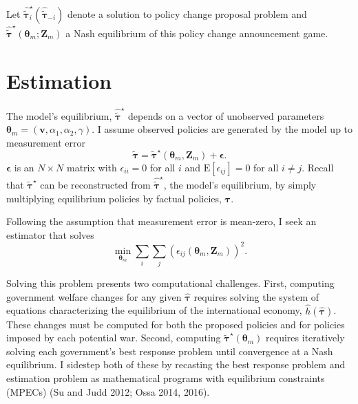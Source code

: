 \documentclass{puthesis}
\newcommand{\E}{\mathrm{E}}
\begin{document}
Let \(\hat{\tilde{\bm{\tau}}}_i^\star(\hat{\tilde{\bm{\tau}}}_{-i})\)
denote a solution to policy change proposal problem and
\(\hat{\tilde{\bm{\tau}}}^\star(\bm{\theta}_m; \bm{Z}_m)\) a Nash
equilibrium of this policy change announcement game.

\section{Estimation}

The model's equilibrium, \(\hat{\tilde{\bm{\tau}}}^\star\) depends on a
vector of unobserved parameters
\(\bm{\theta}_m = \left( \bm{v}, \alpha_1, \alpha_2, \gamma \right)\). I
assume observed policies are generated by the model up to measurement
error \[
\tilde{\bm{\tau}} = \tilde{\bm{\tau}}^\star(\bm{\theta}_m, \bm{Z}_m) + \bm{\epsilon} . 
\] \(\bm{\epsilon}\) is an \(N \times N\) matrix with
\(\epsilon_{ii} = 0\) for all \(i\) and \(\E[\epsilon_{ij}] = 0\) for
all \(i \neq j\). Recall that \(\tilde{\bm{\tau}}^\star\) can be
reconstructed from \(\hat{\tilde{\bm{\tau}}}^\star\), the model's
equilibrium, by simply multiplying equilibrium policies by factual
policies, \(\bm{\tau}\).

Following the assumption that measurement error is mean-zero, I seek an
estimator that solves \begin{equation} \label{eq:estimator}
\min_{\bm{\theta}_m} \sum_i \sum_j \left( \epsilon_{ij}(\bm{\theta}_m, \bm{Z}_m) \right)^2 .
\end{equation}

Solving this problem presents two computational challenges. First,
computing government welfare changes for any given \(\hat{\bm{\tau}}\)
requires solving the system of equations characterizing the equilibrium
of the international economy, \(\hat{h}(\hat{\bm{\tau}})\). These
changes must be computed for both the proposed policies and for policies
imposed by each potential war. Second, computing
\(\tilde{\bm{\tau}}^\star(\bm{\theta}_m)\) requires iteratively solving
each government's best response problem until convergence at a Nash
equilibrium. I sidestep both of these by recasting the best response
problem and estimation problem as mathematical programs with equilibrium
constraints (MPECs) (Su and Judd 2012; Ossa 2014, 2016).
\end{document}

